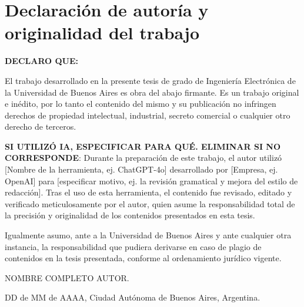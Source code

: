 \thispagestyle{empty}
\null{}
\section*{Declaración de autoría y originalidad del trabajo}
\begin{flushleft}

\textbf{DECLARO QUE:}

El trabajo desarrollado en la presente tesis de grado de Ingeniería Electrónica de la Universidad de Buenos Aires es obra del abajo firmante. Es un trabajo original e inédito, por lo tanto el contenido del mismo y su publicación no infringen derechos de propiedad intelectual, industrial, secreto comercial o cualquier otro derecho de terceros.\newline

\textbf{SI UTILIZÓ IA, ESPECIFICAR PARA QUÉ. ELIMINAR SI NO CORRESPONDE}:\newline
Durante la preparación de este trabajo, el autor utilizó [Nombre de la herramienta, ej. ChatGPT-4o] desarrollado por [Empresa, ej. OpenAI] para [especificar motivo, ej. la revisión gramatical y mejora del estilo de redacción]. Tras el uso de esta herramienta, el contenido fue revisado, editado y verificado meticulosamente por el autor, quien asume la responsabilidad total de la precisión y originalidad de los contenidos presentados en esta tesis.
\newline

Igualmente asumo, ante a la Universidad de Buenos Aires y ante cualquier otra instancia, la responsabilidad que pudiera derivarse en caso de plagio de contenidos en la tesis presentada, conforme al ordenamiento jurídico vigente.
\newline

\begin{flushright}
	NOMBRE COMPLETO AUTOR.
\end{flushright}
DD de MM de AAAA, Ciudad Autónoma de Buenos Aires, Argentina.\newline
\end{flushleft}

\null